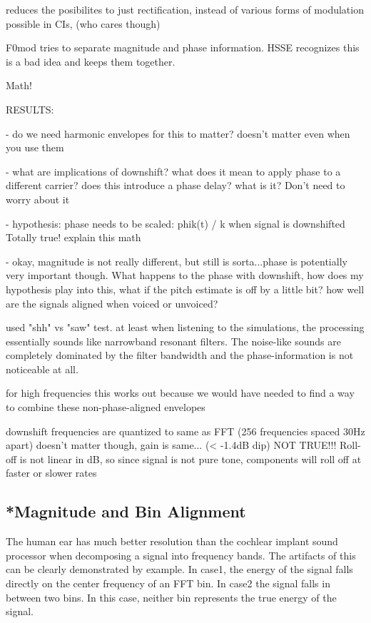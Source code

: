\documentclass [11pt, proquest] {uwthesis}[2015/03/03]
\begin{document}
reduces the posibilites to just rectification, instead of various forms of modulation possible in CIs, (who cares though)

F0mod tries to separate magnitude and phase information.  HSSE recognizes this is a bad idea and keeps them together.

Math!

RESULTS:

 - do we need harmonic envelopes for this to matter?
 doesn't matter even when you use them

 - what are implications of downshift? what does it mean to apply phase to a different carrier? does this introduce a phase delay? what is it?
 Don't need to worry about it
 
 - hypothesis: phase needs to be scaled: phik(t) / k when signal is downshifted
 Totally true! explain this math
 
 - okay, magnitude is not really different, but still is sorta...phase is potentially very important though.  What happens to the phase with downshift, how does my hypothesis play into this, what if the pitch estimate is off by a little bit?  how well are the signals aligned when voiced or unvoiced?
 
used "shh" vs "saw" test.  at least when listening to the simulations, the processing essentially sounds like narrowband resonant filters.  The noise-like sounds are completely dominated by the filter bandwidth and the phase-information is not noticeable at all.

for high frequencies this works out because we would have needed to find a way to combine these non-phase-aligned envelopes

downshift frequencies are quantized to same as FFT (256 frequencies spaced 30Hz apart)
doesn't matter though, gain is same... (< -1.4dB dip)
NOT TRUE!!! Roll-off is not linear in dB, so since signal is not pure tone, components will roll off at faster or slower rates

\subsection{*Magnitude and Bin Alignment}

The human ear has much better resolution than the cochlear implant sound processor when decomposing a signal into frequency bands.  The artifacts of this can be clearly demonstrated by example.  In case1, the energy of the signal falls directly on the center frequency of an FFT bin.  In case2 the signal falls in between two bins.  In this case, neither bin represents the true energy of the signal.
\end{document}
